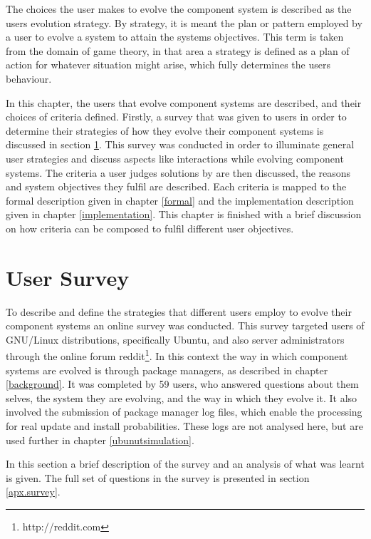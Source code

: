 The choices the user makes to evolve the component system is described as the users evolution strategy.
By strategy, it is meant the plan or pattern employed by a user to evolve a system to attain the systems objectives.
This term is taken from the domain of game theory, 
in that area a strategy is defined as a plan of action for whatever situation might arise, which fully determines the users behaviour.

In this chapter, the users that evolve component systems are described, and their choices of criteria defined.
Firstly, a survey that was given to users in order to determine their strategies of how they evolve their component systems is discussed in section \ref{strat.usersurvey}.
This survey was conducted in order to illuminate general user strategies and discuss aspects like interactions while evolving component systems.
The criteria a user judges solutions by are then discussed, the reasons and system objectives they fulfil are described.
Each criteria is mapped to the formal description given in chapter \ref{formal} and the implementation description given in chapter \ref{implementation}.
This chapter is finished with a brief discussion on how criteria can be composed to fulfil different user objectives. 

\section{User Survey}
\label{strat.usersurvey}
To describe and define the strategies that different users employ to evolve their component systems an online survey was conducted.
This survey targeted users of GNU/Linux distributions, specifically Ubuntu, and also server administrators through the online forum reddit\footnote{http://reddit.com}.
In this context the way in which component systems are evolved is through package managers, as described in chapter \ref{background}.
It was completed by 59 users, who answered questions about them selves, the system they are evolving, and the way in which they evolve it.
It also involved the submission of package manager log files, which enable the processing for real update and install probabilities.
These logs are not analysed here, but are used further in chapter \ref{ubunutsimulation}.

In this section a brief description of the survey and an analysis of what was learnt is given.
The full set of questions in the survey is presented in section \ref{apx.survey}. 

